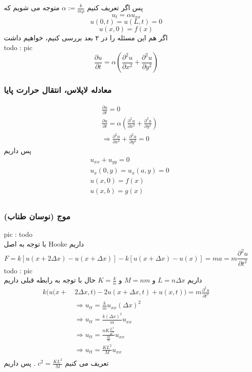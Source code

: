 پس اگر تعریف کنیم
$\alpha := \frac{k}{m\rho}$
متوجه می شویم که\\
\[u_t=\alpha u_{xx}\]
\[u(0,t)=u(L,t)=0\]
\[u(x,0)=f(x)\]
اگر هم این مسئله را در ۲ بعد بررسی کنیم، خواهیم داشت\\
todo : pic
\[\frac{\partial u}{\partial t}=\alpha(\frac{\partial^2 u}{\partial x^2}+\frac{\partial^2 u}{\partial y^2})\]
\subsubsection{
	معادله لاپلاس، انتقال حرارت پایا
}
\begin{equation*}
	\begin{aligned}
	{} &\ \frac{\partial u}{\partial t}=0 \\
	&\ \frac{\partial u}{\partial t}=\alpha(\frac{\partial^2 u}{\partial x^2}+\frac{\partial^2 u}{\partial y^2}) \\
	&\ \Rightarrow \frac{\partial^2 u}{\partial x^2}+\frac{\partial^2 u}{\partial y^2}=0
	\end{aligned}
\end{equation*}
پس داریم
\begin{equation*}
\begin{aligned}
{} &\ 
u_{xx}+u_{yy}=0
\\
&\
u_x(0,y)=u_x(a,y)=0
\\
&\
u(x,0)=f(x)
\\
&\
u(x,b)=g(x)
\\
\end{aligned}
\end{equation*}



\subsubsection{موج (نوسان طناب)}
pic : todo\\
با توجه به اصل
Hooke
 داریم
 \[
 F=k[u(x+2\Delta x)-u(x+\Delta x)]-k[u(x+\Delta x)-u(x)]=ma=m\frac{\partial^2 u}{\partial t^2}
 \]
 todo : pic\\
 داریم 
 $L=n\Delta x$
 و
 $M=nm$
 و
 $K=\frac{k}{n}$
 حال با توجه به رابطه قبلی داریم
 \begin{equation*}
 \begin{aligned}
 k\Big(u(x+{}&\ 2\Delta x,t)- 2u(x+\Delta x,t)+u(x,t)\Big)=m\frac{\partial^2 u}{\partial t^2}\\
 &\  \Rightarrow  u_{tt}=\frac{k}{m}u_{xx}(\Delta x)^2\\
 &\  \Rightarrow u_{tt}=\frac{k(\Delta x)^2}{m}u_{xx}\\ 
 &\ \Rightarrow u_{tt}=\frac{nK\frac{L^2}{K^2}}{\frac{M}{n}}u_{xx}\\
 &\  \Rightarrow u_{tt}=\frac{KL^2}{M}u_{xx} \\
 \end{aligned}
 \end{equation*}
تعریف می کنیم
$c^2 = \frac{KL^2}{M}$
.
پس داریم

